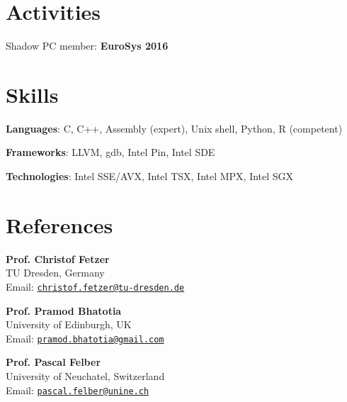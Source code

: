 \documentclass[letterpaper]{article}
\renewenvironment{itemize}{
  \begin{list}{}{
    \setlength{\leftmargin}{1.5em}
  }
}{
  \end{list}
}
\begin{document}
\section*{Activities}


\begin{itemize}
 \item { Shadow PC member:} {\bf EuroSys 2016}
\end{itemize}
  

\section*{Skills}
\begin{itemize}
	\item {\bf Languages}: C, C++, Assembly (expert), Unix shell, Python, R (competent)
	\item {\bf Frameworks}: LLVM, gdb, Intel Pin, Intel SDE
	\item {\bf Technologies}: Intel SSE/AVX, Intel TSX, Intel MPX, Intel SGX
\end{itemize}


\section*{References}

\begin{itemize}

\item {\bf Prof. Christof Fetzer }  \\
TU Dresden, Germany\\
Email: \href{mailto:christof.fetzer@tu-dresden.de}{\tt christof.fetzer@tu-dresden.de}
      
\item {\bf  Prof. Pramod Bhatotia }  \\
University of Edinburgh, UK\\
Email: \href{mailto:pramod.bhatotia@gmail.com}{\tt pramod.bhatotia@gmail.com}

\item {\bf Prof. Pascal Felber} \\
University of Neuchatel, Switzerland\\
Email: \href{mailto:pascal.felber@unine.ch}{\tt pascal.felber@unine.ch}

\end{itemize}
\end{document}
